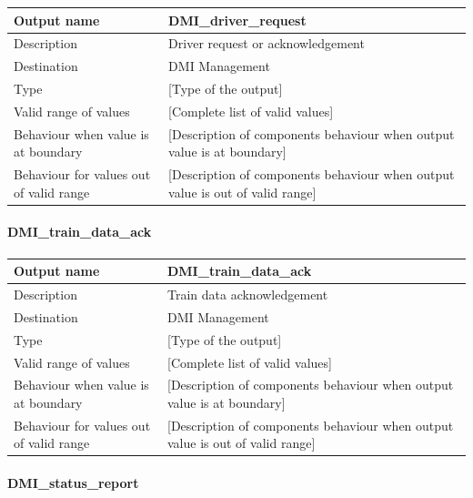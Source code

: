 \begin{longtable}{p{}p{}}
\toprule
Output name				& DMI\_driver\_request \\
\midrule
Description				& Driver request or acknowledgement \\
\midrule
Destination				& DMI Management \\ 
\midrule
Type					& [Type of the output] \\
\midrule
Valid range of values	& [Complete list of valid values] \\
\midrule
Behaviour when value is at boundary	& [Description of components behaviour when output value is at boundary] \\
\midrule
Behaviour for values out of valid range	& [Description of components behaviour when output value is out of valid range] \\
\bottomrule
\end{longtable}


\paragraph{DMI\_train\_data\_ack}

\begin{longtable}{p{}p{}}
\toprule
Output name				& DMI\_train\_data\_ack \\
\midrule
Description				& Train data acknowledgement \\
\midrule
Destination				& DMI Management \\ 
\midrule
Type					& [Type of the output] \\
\midrule
Valid range of values	& [Complete list of valid values] \\
\midrule
Behaviour when value is at boundary	& [Description of components behaviour when output value is at boundary] \\
\midrule
Behaviour for values out of valid range	& [Description of components behaviour when output value is out of valid range] \\
\bottomrule
\end{longtable}


\paragraph{DMI\_status\_report}

